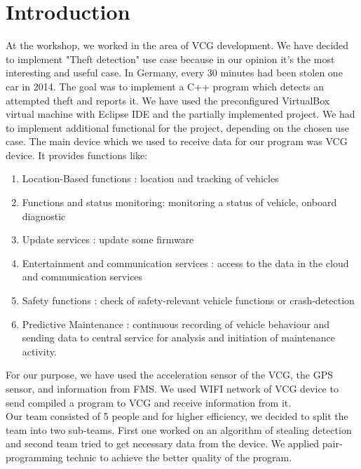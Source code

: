 \chapter{Introduction}
At the workshop, we worked in the area of VCG development. We have decided to implement "Theft detection" use case because in our opinion it's the most interesting and useful case. In Germany, every 30 minutes had been stolen one car in 2014. 
The goal was to implement a C++ program which detects an attempted theft and reports it. We have used the preconfigured VirtualBox virtual machine with Eclipse IDE and the partially implemented project. We had to implement additional functional for the project, depending on the chosen use case.  The main device which we used to receive data for our program was VCG device. It provides functions like: 
\begin{enumerate}
	\item Location-Based functions : location and tracking of vehicles 
	\item Functions and status monitoring:  monitoring a status of vehicle, onboard diagnostic
	\item Update services : update some firmware
	\item Entertainment and communication services : access to the data in the cloud and communication services
	\item Safety functions : check of safety-relevant vehicle functions or crash-detection
	\item Predictive Maintenance : continuous recording of vehicle behaviour and sending data to central service for analysis and initiation of maintenance activity.
\end{enumerate}
For our purpose, we have used the acceleration sensor of the VCG, the GPS sensor, and information from FMS. We used WIFI network of VCG device to send compiled a program to VCG and receive information from it.\\
Our team consisted of 5 people and for higher efficiency, we decided to split the team into two sub-teams. First one worked on an algorithm of stealing detection and second team tried to get necessary data from the device. We applied pair-programming technic to achieve the better quality of the program.\\

